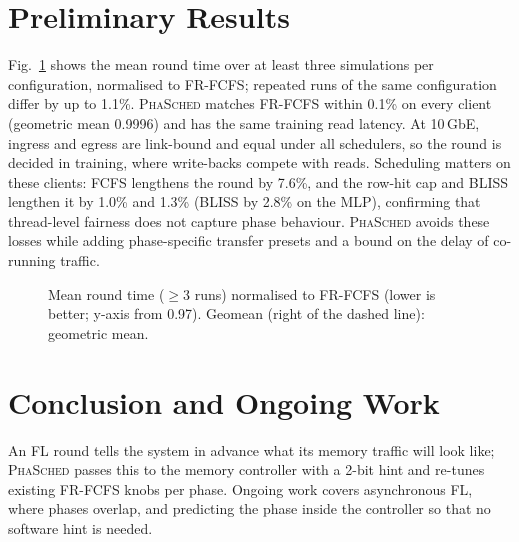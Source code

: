 \documentclass[conference]{IEEEtran}
\newcommand{\name}{\textsc{PhaSched}}
\begin{document}
\section{Preliminary Results}
Fig.~\ref{fig:results} shows the mean round time over at least three simulations per configuration, normalised to FR-FCFS; repeated runs of the same configuration differ by up to 1.1\%. \name{} matches FR-FCFS within 0.1\% on every client (geometric mean 0.9996) and has the same training read latency. At 10\,GbE, ingress and egress are link-bound and equal under all schedulers, so the round is decided in training, where write-backs compete with reads. Scheduling matters on these clients: FCFS lengthens the round by 7.6\%, and the row-hit cap and BLISS lengthen it by 1.0\% and 1.3\% (BLISS by 2.8\% on the MLP), confirming that thread-level fairness does not capture phase behaviour. \name{} avoids these losses while adding phase-specific transfer presets and a bound on the delay of co-running traffic.

\begin{figure}[t]
\centering
{}
\caption{Mean round time ($\geq$3 runs) normalised to FR-FCFS (lower is better; y-axis from 0.97). Geomean (right of the dashed line): geometric mean.}
\label{fig:results}
\end{figure}

\section{Conclusion and Ongoing Work}
An FL round tells the system in advance what its memory traffic will look like; \name{} passes this to the memory controller with a 2-bit hint and re-tunes existing FR-FCFS knobs per phase. Ongoing work covers asynchronous FL, where phases overlap, and predicting the phase inside the controller so that no software hint is needed.


\end{document}
